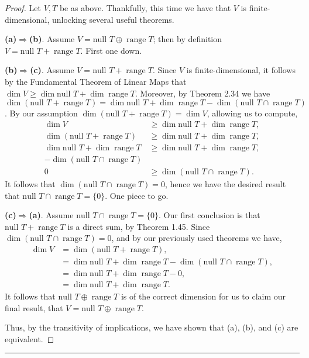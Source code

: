 \documentclass[letterpaper, 12pt]{amsart}
\renewcommand{\null}{\text{null }}					%
\DeclareMathOperator{\range}{\text{range }}			%
\theoremstyle{definition}  							%
\newcommand{\Ra}{\Rightarrow}                   %
\begin{document}
		\begin{proof}
		Let $V,T$ be as above.
		Thankfully, this time we have that $V$ is finite-dimensional, unlocking several useful theorems.

		\textbf{(a)$\Ra$(b)}.
		Assume $V = \null T \oplus \range T$; then by definition $V = \null T + \range T$.
		First one down.

		\textbf{(b)$\Ra$(c)}.
		Assume $V = \null T + \range T$.
		Since $V$ is finite-dimensional, it follows by the Fundamental Theorem of Linear Maps that $\dim V \geq \dim \null T + \dim \range T$.
		Moreover, by Theorem 2.34 we have $\dim(\null T + \range T) = \dim{\null T} + \dim{\range T} - \dim{(\null{T}\cap\range{T})}$.
		By our assumption $\dim(\null T + \range T) = \dim{V}$, allowing us to compute,
			\begin{align*}
				\dim V &\geq \dim \null T + \dim \range T, \\
				\dim(\null T + \range T) &\geq \dim \null T + \dim \range T, \\
				\dim{\null T} + \dim{\range T} &\geq \dim \null T + \dim \range T, \\
				- \dim{(\null{T}\cap\range{T})} & \\
				0 &\geq \dim{(\null{T}\cap\range{T})}.
			\end{align*}
		It follows that $\dim{(\null{T}\cap\range{T})} = 0$, hence we have the desired result that $\null T \cap \range T = \{0\}$.
		One piece to go.

		\textbf{(c)$\Ra$(a)}.
		Assume $\null T \cap \range T = \{0\}$.
		Our first conclusion is that $\null T + \range T$ is a direct sum, by Theorem 1.45.
		Since $\dim{(\null T \cap \range T)} = 0$, and by our previously used theorems we have,
			\begin{align*}
			\dim{V} &= \dim(\null T + \range T), \\
			&= \dim{\null T} + \dim{\range T} - \dim{(\null{T}\cap\range{T})}, \\
			&= \dim{\null T} + \dim{\range T} - 0, \\
			&= \dim{\null T} + \dim{\range T}.
			\end{align*}
		It follows that $\null T \oplus \range T$ is of the correct dimension for us to claim our final result, that $V = \null T \oplus \range T$.
		
		Thus, by the transitivity of implications, we have shown that (a), (b), and (c) are equivalent.		
		\end{proof}
		\vspace*{2mm}
		\hrule
		\vspace*{2mm}
\end{document}
